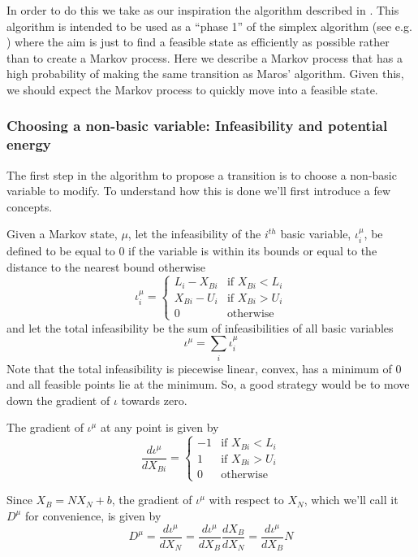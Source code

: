 \documentclass{article}
\begin{document}
In order to do this we take as our inspiration the algorithm described in \cite{maros1986general}. This algorithm is intended to be used as a ``phase 1'' of the simplex algorithm (see e.g. \cite{vanderbei2015linear}) where the aim is just to find a feasible state as efficiently as possible rather than to create a Markov process. Here we describe a Markov process that has a high probability of making the same transition as Maros' algorithm. Given this, we should expect the Markov process to quickly move into a feasible state.


\subsubsection{Choosing a non-basic variable: Infeasibility and potential energy}

The first step in the algorithm to propose a transition is to choose a non-basic variable to modify. To understand how this is done we'll first introduce a few concepts.

Given a Markov state, $\mu$, let the infeasibility of the $i^{th}$ basic variable, $\iota^\mu_i$, be defined to be equal to 0 if the variable is within its bounds or equal to the distance to the nearest bound otherwise
\[
\iota^\mu_i =
\begin{cases}
L_i-X_{Bi} & \text{if }X_{Bi}<L_i\\
X_{Bi}-U_i & \text{if }X_{Bi}>U_i\\
0 & \text{otherwise}
\end{cases}
\]
and let the total infeasibility be the sum of infeasibilities of all basic variables
\[
\iota^\mu = \sum_i \iota^\mu_i
\]
Note that the total infeasibility is piecewise linear, convex, has a minimum of 0 and all feasible points lie at the minimum. So, a good strategy would be to move down the gradient of $\iota$ towards zero.

The gradient of $\iota^\mu$ at any point is given by
\[
\frac{d\iota^\mu}{dX_{Bi}} = 
\begin{cases}
-1 & \text{if }X_{Bi}<L_i\\
1 & \text{if }X_{Bi}>U_i\\
0 & \text{otherwise}
\end{cases}
\]

Since $X_B = NX_N + b$, the gradient of $\iota^\mu$ with respect to $X_N$, which we'll call it $D^\mu$ for convenience, is given by
\[
D^\mu = \frac{d\iota^\mu}{dX_N} = \frac{d\iota^\mu}{dX_B}\frac{dX_B}{dX_N} =  \frac{d\iota^\mu}{dX_B}N
\]
\end{document}
